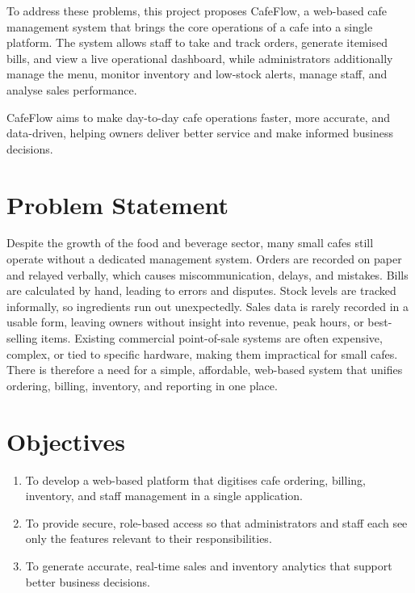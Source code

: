 \documentclass[12pt,a4paper]{report}
\begin{document}
To address these problems, this project proposes CafeFlow, a web-based cafe
management system that brings the core operations of a cafe into a single platform. The system
allows staff to take and track orders, generate itemised bills, and view a live operational
dashboard, while administrators additionally manage the menu, monitor inventory and low-stock
alerts, manage staff, and analyse sales performance.

CafeFlow aims to make day-to-day cafe operations faster, more accurate, and data-driven,
helping owners deliver better service and make informed business decisions.

\section{Problem Statement}
Despite the growth of the food and beverage sector, many small cafes still operate without a
dedicated management system. Orders are recorded on paper and relayed verbally, which causes
miscommunication, delays, and mistakes. Bills are calculated by hand, leading to errors and
disputes. Stock levels are tracked informally, so ingredients run out unexpectedly. Sales data
is rarely recorded in a usable form, leaving owners without insight into revenue, peak hours,
or best-selling items. Existing commercial point-of-sale systems are often expensive, complex,
or tied to specific hardware, making them impractical for small cafes. There is therefore a
need for a simple, affordable, web-based system that unifies ordering, billing, inventory, and
reporting in one place.

\section{Objectives}
\begin{enumerate}
  \item To develop a web-based platform that digitises cafe ordering, billing, inventory, and
        staff management in a single application.
  \item To provide secure, role-based access so that administrators and staff each see only the
        features relevant to their responsibilities.
  \item To generate accurate, real-time sales and inventory analytics that support better
        business decisions.
\end{enumerate}
\end{document}
